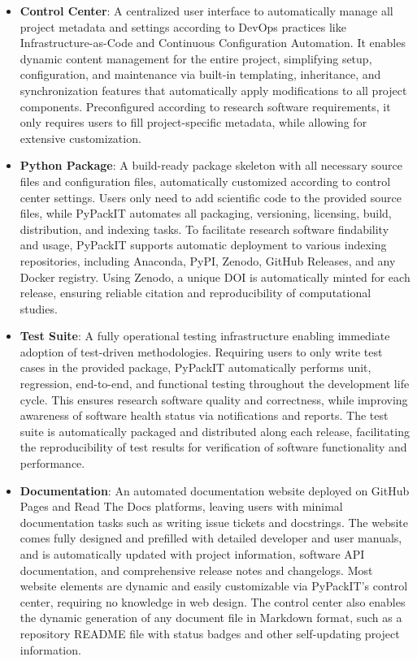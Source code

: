\documentclass{article}
\begin{document}
\begin{itemize}
    \item \textbf{Control Center}: A centralized user interface to automatically manage all project metadata and settings according to DevOps practices like Infrastructure-as-Code and Continuous Configuration Automation. It enables dynamic content management for the entire project, simplifying setup, configuration, and maintenance via built-in templating, inheritance, and synchronization features that automatically apply modifications to all project components. Preconfigured according to research software requirements, it only requires users to fill project-specific metadata, while allowing for extensive customization.
    \item \textbf{Python Package}: A build-ready package skeleton with all necessary source files and configuration files, automatically customized according to control center settings. Users only need to add scientific code to the provided source files, while PyPackIT automates all packaging, versioning, licensing, build, distribution, and indexing tasks. To facilitate research software findability and usage, PyPackIT supports automatic deployment to various indexing repositories, including Anaconda, PyPI, Zenodo, GitHub Releases, and any Docker registry. Using Zenodo, a unique DOI is automatically minted for each release, ensuring reliable citation and reproducibility of computational studies.
    \item \textbf{Test Suite}: A fully operational testing infrastructure enabling immediate adoption of test-driven methodologies. Requiring users to only write test cases in the provided package, PyPackIT automatically performs unit, regression, end-to-end, and functional testing throughout the development life cycle. This ensures research software quality and correctness, while improving awareness of software health status via notifications and reports. The test suite is automatically packaged and distributed along each release, facilitating the reproducibility of test results for verification of software functionality and performance.
    \item \textbf{Documentation}: An automated documentation website deployed on GitHub Pages and Read The Docs platforms, leaving users with minimal documentation tasks such as writing issue tickets and docstrings. The website comes fully designed and prefilled with detailed developer and user manuals, and is automatically updated with project information, software API documentation, and comprehensive release notes and changelogs. Most website elements are dynamic and easily customizable via PyPackIT's control center, requiring no knowledge in web design. The control center also enables the dynamic generation of any document file in Markdown format, such as a repository README file with status badges and other self-updating project information.
\end{itemize}
\end{document}
